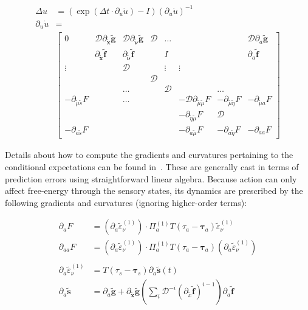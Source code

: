 \documentclass[a4paper]{article} %
\begin{document}
\begin{align}
\Delta u &=(\exp (\Delta t \cdot \partial_u \dot{u}) - I)(\partial_u \dot{u})^{-1} \nonumber \\%
\partial_u \dot{u} &= \nonumber \\%
%
& \left[\begin{array}{cccccccc}
0 & \mathcal{D}\partial_{\tilde{\bm{x}}} \tilde{\bm{g}}  & \mathcal{D}\partial_{\tilde{\bm{\nu}}} \tilde{\bm{g}} & \mathcal{D} & \ldots & & & \mathcal{D}\partial_a\tilde{\bm{g}}  \\%
 & \partial_{\tilde{\bm{x}}} \tilde{\bm{f}}  & \partial_{\tilde{\bm{\nu}}} \tilde{\bm{f}} &  & I  & & & \partial_a\tilde{\bm{f}}  \\%
\vdots &  & \mathcal{D} & & \vdots & \vdots & &  \\%
 & &  & \mathcal{D}&  &  &  & \\%
 & & \ldots & & \mathcal{D} &  & \ldots & \\%
- \partial_{\tilde{\mu}\tilde{s}} F &  & \ldots &  & & -\mathcal{D}\partial_{\tilde{\mu}\tilde{\mu}} F & - \partial_{\tilde{\mu}\tilde{\eta}} F & -\partial_{\tilde{\mu}a} F  \\%
 &  & &  & & -\partial_{\tilde{\eta}\tilde{\mu}} F & \mathcal{D} &   \\%
- \partial_{a\tilde{s}} F &  & &  & & - \partial_{a\tilde{\mu}} F & - \partial_{a\tilde{\eta}} F &  - \partial_{aa} F %
\end{array}\right]  \label{eq:app3-2}%
\end{align}%


Details about how to compute the gradients and curvatures pertaining to the conditional expectations can be found in~\citep{Friston10d}. These are generally cast in terms of prediction errors using straightforward linear algebra. Because action can only affect free-energy through the sensory states, its dynamics are prescribed by the following gradients and curvatures (ignoring higher-order terms): 

\begin{align}
\partial_a F &= (\partial_a \tilde{\varepsilon}^{(1)}_\nu)  \cdot  \Pi^{(1)}_a T(\tau_a -\bm{\tau}_a)  \tilde{\varepsilon}^{(1)}_\nu \nonumber  \\%
\partial_{aa} F &= (\partial_a \tilde{\varepsilon}^{(1)}_\nu)  \cdot  \Pi^{(1)}_a T(\tau_a -\bm{\tau}_a)  (\partial_a \tilde{\varepsilon}^{(1)}_\nu) \nonumber  \\%
\label{eq:app3-3} \\%
\partial_a \tilde{\varepsilon}^{(1)}_\nu &= T(\tau_s-\bm{\tau}_s)  \partial_a \bm{\tilde{s}}(t) \nonumber \\%
\partial_a  \bm{\tilde{s}} &= \partial_a  \bm{\tilde{g}} + \partial_{\tilde{\bm{x}}} \bm{\tilde{g}}( \sum_i \mathcal{D}^{-i}(\partial_{\tilde{x}} \tilde{\bm{f}}) ^{i-1}) \partial_{a} \tilde{\bm{f}} \nonumber  %
\end{align}%
\end{document}
